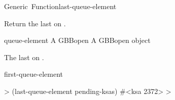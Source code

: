 \documentclass[10pt,twoside,english,pdftex]{article}
\begin{document}
\begin{functiondoc}{Generic~Function}{last-queue-element}{
    }
%

\fnsyntax

\fnpurpose Return the last  on .

\fnmethods
{}

\fnpackage {}

\fnmodule {}

\fnargs
\begin{args}{queue-element}
\arg[queue] A GBBopen 
 A GBBopen  object
\end{args}

\fnreturns The last  on .
  
\begin{alsos}{first-queue-element}
\end{alsos}

\fnexample
%
\W\supp
\begin{example}
  > (last-queue-element pending-ksas)
  #<ksa 2372>
  >
\end{example}

\end{functiondoc}

\end{document}
